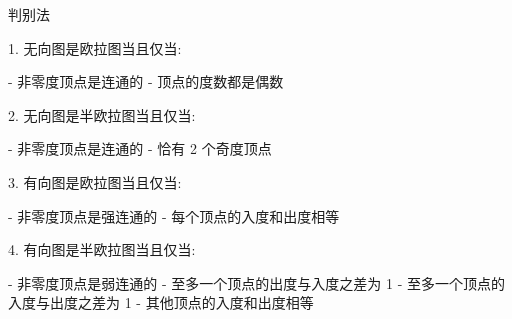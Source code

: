 判别法

1. 无向图是欧拉图当且仅当:

- 非零度顶点是连通的
- 顶点的度数都是偶数

2. 无向图是半欧拉图当且仅当:

- 非零度顶点是连通的
- 恰有 2 个奇度顶点

3. 有向图是欧拉图当且仅当:

- 非零度顶点是强连通的
- 每个顶点的入度和出度相等

4. 有向图是半欧拉图当且仅当:

- 非零度顶点是弱连通的
- 至多一个顶点的出度与入度之差为 1
- 至多一个顶点的入度与出度之差为 1
- 其他顶点的入度和出度相等